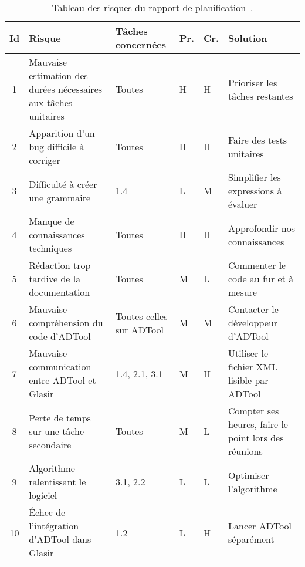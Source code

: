     \begin{table}[H]
        \centering
        \begin{tabular}{|c|p{4cm}|l|l|l|p{4cm}|}
        	\hline
            \textbf{Id} & \textbf{Risque} & \textbf{Tâches concernées} & \textbf{Pr.} & \textbf{Cr.} & \textbf{Solution}\\
            \hline
            1 & Mauvaise estimation des durées nécessaires aux tâches unitaires & 
                Toutes & H & H &
                Prioriser les tâches restantes\\ 
            \hline
            2 & Apparition d'un bug difficile à corriger & 
                Toutes & H & H &
                Faire des tests unitaires\\
            \hline
            3 & Difficulté à créer une grammaire & 
                1.4 & L & M &
                Simplifier les expressions à évaluer\\ 
            \hline
            4 & Manque de connaissances techniques & 
                Toutes & H & H &
                Approfondir nos connaissances\\ 
            \hline
            5 & Rédaction trop tardive de la documentation & 
                Toutes & M & L &
                Commenter le code au fur et à mesure\\
            \hline
            6 & Mauvaise compréhension du code d'ADTool & 
                Toutes celles sur ADTool & M & M &
                Contacter le développeur d'ADTool\\ 
            \hline
            7 & Mauvaise communication entre ADTool et Glasir & 
                1.4, 2.1, 3.1 & M & H &
                Utiliser le fichier XML lisible par ADTool\\ 
            \hline
            8 & Perte de temps sur une tâche secondaire & 
                Toutes & M & L &
                Compter ses heures, faire le point lors des réunions\\ 
            \hline
            9 & Algorithme ralentissant le logiciel & 
                3.1, 2.2 & L & L &
                Optimiser l’algorithme\\ 
            \hline
            10 & Échec de l'intégration d'ADTool dans Glasir & 
                1.2 & L & H &
                Lancer ADTool séparément\\ 
            \hline
        \end{tabular}
        \caption{Tableau des risques du rapport de planification~\cite{planif}.}
        \label{fig:risques}
    \end{table}
    
